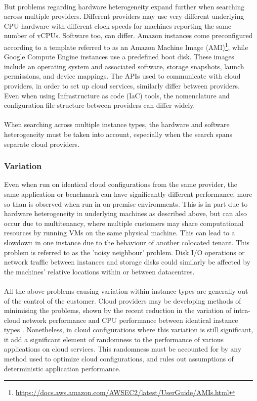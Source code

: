 \documentclass{report}
\begin{document}
\paragraph{}
But problems regarding hardware heterogeneity expand further when searching across multiple providers. Different providers may use very different underlying CPU hardware with different clock speeds for machines reporting the same number of vCPUs. Software too, can differ. Amazon instances come preconfigured according to a template referred to as an Amazon Machine Image (AMI)\footnote{\url{https://docs.aws.amazon.com/AWSEC2/latest/UserGuide/AMIs.html}}, while Google Compute Engine instances use a predefined boot disk. These images include an operating system and associated software, storage snapshots, launch permissions, and device mappings. The APIs used to communicate with cloud providers, in order to set up cloud services, similarly differ between providers. Even when using Infrastructure as code (IaC) tools, the nomenclature and configuration file structure between providers can differ widely.
\paragraph{}
When searching across multiple instance types, the hardware and software heterogeneity must be taken into account, especially when the search spans separate cloud providers. 
\subsubsection{Variation}
Even when run on identical cloud configurations from the same provider, the same application or benchmark can have significantly different performance, more so than is observed when run in on-premise environments\cite{Leitner2014}. This is in part due to hardware heterogeneity in underlying machines as described above, but can also occur due to multitenancy, where multiple customers may share computational resources by running VMs on the same physical machine. This can lead to a slowdown in one instance due to the behaviour of another colocated tenant. This problem is referred to as the 'noisy neighbour' problem\cite{Gkatzikis2013}. Disk I/O operations or network traffic between instances and storage disks could similarly be affected by the machines' relative locations within or between datacentres. 
\paragraph{}
All the above problems causing variation within instance types are generally out of the control of the customer. Cloud providers may be developing methods of minimising the problems, shown by the recent reduction in the variation of intra-cloud network performance\cite{Scheuner2018, Scheuner2018a} and CPU performance between identical instance types \cite{Davatz2017, Laaber2019, Scheuner2018}.  Nonetheless, in cloud configurations where this variation is still significant, it add a significant element of randomness to the performance of various applications on cloud services. This randomness must be accounted for by any method used to optimize cloud configurations, and rules out assumptions of deterministic application performance. 
\end{document}
